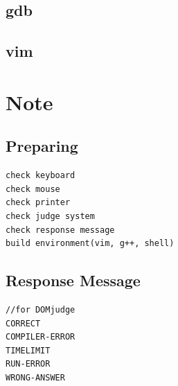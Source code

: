 \documentclass[a4paper, landscape, 8pt]{article}
\begin{document}
\begin{multicols*}{3}
\subsection{gdb}

\subsection{vim}

\section{Note}
\subsection{Preparing}
\begin{lstlisting}[]
check keyboard
check mouse
check printer
check judge system
check response message
build environment(vim, g++, shell)
\end{lstlisting}
\subsection{Response Message}
\begin{lstlisting}[]
//for DOMjudge
CORRECT
COMPILER-ERROR
TIMELIMIT
RUN-ERROR
WRONG-ANSWER
\end{lstlisting}
\end{multicols*}
\end{document}
